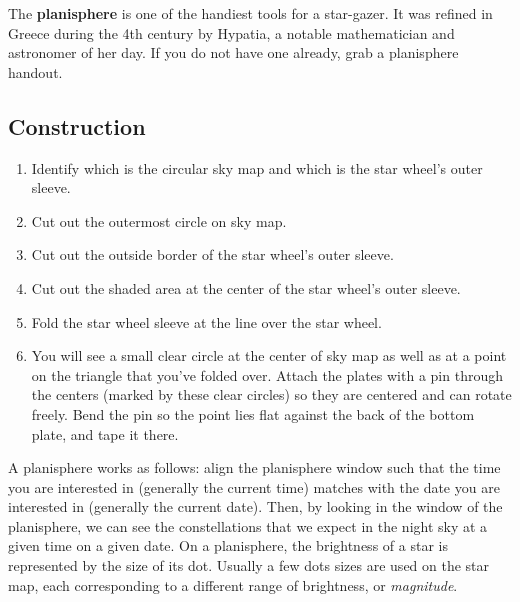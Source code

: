\documentclass[11pt]{article}
\begin{document}
The \textbf{planisphere} is one of the handiest tools for a star-gazer. It was refined in Greece during the 4th century by Hypatia, a notable mathematician and astronomer of her day.  If you do not have one already, grab a planisphere handout.

\subsection{Construction}
\begin{enumerate}
    \item Identify which is the circular sky map and which is the star wheel's outer sleeve.
    \item Cut out the outermost circle on sky map.
    \item Cut out the outside border of the star wheel's outer sleeve.
    \item Cut out the shaded area at the center of the star wheel's outer sleeve.
    \item Fold the star wheel sleeve at the line over the star wheel.
    \item You will see a small clear circle at the center of sky map as well as at a point on the triangle that you've folded over. Attach the plates with a pin through the centers (marked by these clear circles) so they are centered and can rotate freely. Bend the pin so the point lies flat against the back of the bottom plate, and tape it there.
\end{enumerate}

A planisphere works as follows: align the planisphere window such that the time you are interested in (generally the current time) matches with the date you are interested in (generally the current date). Then, by looking in the window of the planisphere, we can see the constellations that we expect in the night sky at a given time on a given date. On a planisphere, the brightness of a star is represented by the size of its dot. Usually a few dots sizes are used on the star map, each corresponding to a different range of brightness, or \textit{magnitude}.
\end{document}
